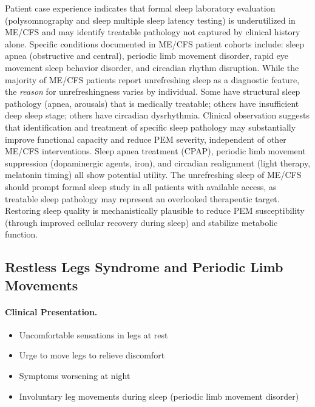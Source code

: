 \begin{observation}
\label{obs:sleep-disorders-underrecognized}
Patient case experience indicates that formal sleep laboratory evaluation (polysomnography and sleep multiple sleep latency testing) is underutilized in ME/CFS and may identify treatable pathology not captured by clinical history alone. Specific conditions documented in ME/CFS patient cohorts include: sleep apnea (obstructive and central), periodic limb movement disorder, rapid eye movement sleep behavior disorder, and circadian rhythm disruption. While the majority of ME/CFS patients report unrefreshing sleep as a diagnostic feature, the \emph{reason} for unrefreshingness varies by individual. Some have structural sleep pathology (apnea, arousals) that is medically treatable; others have insufficient deep sleep stage; others have circadian dysrhythmia. Clinical observation suggests that identification and treatment of specific sleep pathology may substantially improve functional capacity and reduce PEM severity, independent of other ME/CFS interventions. Sleep apnea treatment (CPAP), periodic limb movement suppression (dopaminergic agents, iron), and circadian realignment (light therapy, melatonin timing) all show potential utility. The unrefreshing sleep of ME/CFS should prompt formal sleep study in all patients with available access, as treatable sleep pathology may represent an overlooked therapeutic target. Restoring sleep quality is mechanistically plausible to reduce PEM susceptibility (through improved cellular recovery during sleep) and stabilize metabolic function.
\end{observation}

\subsection{Restless Legs Syndrome and Periodic Limb Movements}
\label{subsec:rls}

\paragraph{Clinical Presentation.}
\begin{itemize}
    \item Uncomfortable sensations in legs at rest
    \item Urge to move legs to relieve discomfort
    \item Symptoms worsening at night
    \item Involuntary leg movements during sleep (periodic limb movement disorder)
\end{itemize}

